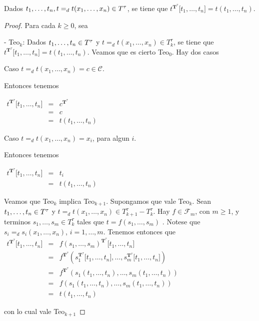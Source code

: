 
  \begin{lemma} \label{lemma_85}
    \PN Dados $t_{1}, \dotsc, t_{n}, t =_{d} t(x_{1}, \dotsc, x_{n}) \in T^{\tau}$, se tiene que $t^{\mathbf{T}^{\tau}}
    \lbrack t_{1}, \dotsc, t_{n} \rbrack = t(t_{1}, \dotsc, t_{n})$.
  \end{lemma}
  \begin{proof}
    Para cada $k\geq 0$, sea

    - Teo$_{k}$: Dados $t_{1}, \dotsc, t_{n}\in T^{\tau}$ y $ t=_{d}t(x_{1}, \dotsc, x_{n})\in T_{k}^{\tau }$, se tiene que $t^{\mathbf{T} ^{\tau }}\lbrack t_{1}, \dotsc, t_{n}\rbrack=t(t_{1}, \dotsc, t_{n})$.
    Veamos que es cierto Teo$_{0}$. Hay dos casos

    Caso $t=_{d}t(x_{1}, \dotsc, x_{n})=c\in \mathcal{C}$.

    Entonces tenemos

    $\displaystyle \begin{array}{cll} t^{\mathbf{T}^{\tau }}\lbrack t_{1}, \dotsc, t_{n}\rbrack & = & c^{\mathbf{T}^{\tau }} \\ & = & c \\ & = & t(t_{1}, \dotsc, t_{n}) \end{array} $

    Caso $t=_{d}t(x_{1}, \dotsc, x_{n})=x_{i}$, para algun $i$.

    Entonces tenemos

    $\displaystyle \begin{array}{cll} t^{\mathbf{T}^{\tau }}\lbrack t_{1}, \dotsc, t_{n}\rbrack & = & t_{i} \\ & = & t(t_{1}, \dotsc, t_{n}) \end{array} $

    Veamos que Teo$_{k}$ implica Teo$_{k+1}$. Supongamos que vale Teo$_{k}$. Sean $t_{1}, \dotsc, t_{n}\in T^{\tau}$ y $t=_{d}t(x_{1}, \dotsc, x_{n})\in T_{k+1}^{\tau }-T_{k}^{\tau }$. Hay $f\in \mathcal{F}_{m}$, con $m\geq 1$, y terminos $s_{1}, \dotsc, s_{m}\in T_{k}^{\tau }$ tales que $t=f(s_{1}, \dotsc, s_{m})$ . Notese que $s_{i}=_{d}s_{i}(x_{1}, \dotsc, x_{n})$, $i=1, \dotsc, m$. Tenemos entonces que
    $\displaystyle \begin{array}{lll} t^{\mathbf{T}^{\tau }}\lbrack t_{1}, \dotsc, t_{n}\rbrack & = & f(s_{1}, \dotsc, s_{m})^{\mathbf{T} ^{\tau }}\lbrack t_{1}, \dotsc, t_{n}\rbrack \\ & = & f^{\mathbf{T}^{\tau }}(s_{1}^{\mathbf{T}^{\tau }}\lbrack t_{1}, \dotsc, t_{n}\rbrack, \dotsc, s_{m}^{\mathbf{T}^{\tau }}\lbrack t_{1}, \dotsc, t_{n}\rbrack) \\ & = & f^{\mathbf{T}^{\tau }}(s_{1}(t_{1}, \dotsc, t_{n}), \dotsc, s_{m}(t_{1}, \dotsc, t_{n})) \\ & = & f(s_{1}(t_{1}, \dotsc, t_{n}), \dotsc, s_{m}(t_{1}, \dotsc, t_{n})) \\ & = & t(t_{1}, \dotsc, t_{n}) \end{array} $

    con lo cual vale Teo$_{k+1}$
  \end{proof}

